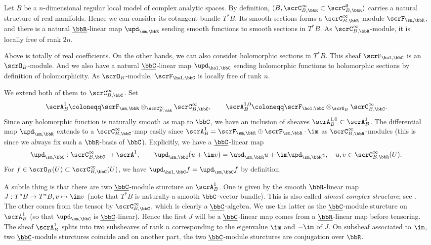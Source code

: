 \begin{construction}
	Let $B$ be a $n$-dimensional regular local model of complex analytic spaces.
	By definition, $(B,\scrC_{B,\bbR}^\infty \subset \scrC_{B,\bbR}^0)$ carries a natural structure of real manifolds.
	Hence we can consider its cotangent bundle $T^*B$.
	Its smooth sections forms a $\scrC_{B,\bbR}^\infty$-module $\scrF_{\sm,\bbR}$, and there is a natural $\underline{\bbR}$-linear map $\upd_{\sm,\bbR}$ sending smooth functions to smooth sections in $T^*B$.
	As $\scrC_{B,\bbR}^\infty$-module, it is locally free of rank $2n$.

	Above is totally of real coefficients.
	On the other hands, we can also consider holomorphic sections in $T^*B$.
	This sheaf $\scrF_{\hol,\bbC}$ is an $\scrO_B$-module.
	And we also have a natural $\underline{\bbC}$-linear map $\upd_{\hol,\bbC}$ sending holomorphic functions to holomorphic sections by definition of holomorphicity.
	As $\scrO_{B}$-module, $\scrF_{\hol,\bbC}$ is locally free of rank $n$.

	We extend both of them to $\scrC_{B,\bbC}^\infty$.
	Set
	\[ \scrA_B^1 \coloneqq \scrF_{\sm,\bbR} \otimes_{\scrC^{\infty}_{B,\bbR}} \scrC^{\infty}_{B,\bbC}, \qquad \scrA_B^{1,0} \coloneqq \scrF_{\hol,\bbC} \otimes_{\scrO_{B}} \scrC^{\infty}_{B,\bbC}. \]
	Since any holomorphic function is naturally smooth as map to $\bbC$, we have an inclusion of sheaves $\scrA_{B}^{1,0} \subset \scrA_B^1$.
	The differential map $\upd_{\sm,\bbR}$ extends to a $\scrC_{B,\bbC}^\infty$-map easily since $\scrA_B^1 = \scrF_{\sm,\bbR} \oplus \scrF_{\sm,\bbR} \cdot \im$ as $\scrC^{\infty}_{B,\bbR}$-modules (this is since we always fix such a $\bbR$-basis of $\bbC$).
	Explicitly, we have a $\underline{\bbC}$-linear map
	\[ \upd_{\sm,\bbC}: \scrC_{B,\bbC}^\infty \to \scrA^1, \qquad \upd_{\sm,\bbC}(u+\im v) = \upd_{\sm,\bbR} u + \im \upd_{\sm,\bbR} v, \quad u,v \in \scrC_{B,\bbR}^\infty(U). \]
	For $f \in \scrO_B(U) \subset \scrC_{B,\bbC}^\infty(U)$, we have $\upd_{\hol,\bbC}f = \upd_{\sm,\bbC}f$ by definition.

	A subtle thing is that there are two $\underline{\bbC}$-module sturcture on $\scrA_B^1$.
	One is given by the smooth $\bbR$-linear map $J: T^*B \to T^*B, v \mapsto \im v$ (note that $T^*B$ is naturally a smooth $\bbC$-vector bundle).
	This is also called \emph{almost complex structure}; see \Yang{}.
	The other comes from the tensor by $\scrC^{\infty}_{B,\bbC}$, which is clearly a $\underline{\bbC}$-algebra.
	We use ths latter as the $\underline{\bbC}$-module sturcture on $\scrA_B^1$ (so that $\upd_{\sm,\bbC}$ is $\underline{\bbC}$-linear).
	Hence the first $J$ will be a $\underline{\bbC}$-linear map comes from a $\underline{\bbR}$-linear map before tensoring.
	The sheaf $\scrA_B^1$ splits into two subsheaves of rank $n$ corresponding to the eigenvalue $\im$ and $-\im$ of $J$.
	On subsheaf associated to $\im$, two $\underline{\bbC}$-module sturctures coincide and on another part, the two $\underline{\bbC}$-module sturctures are conjugation over $\bbR$.


\end{construction}
